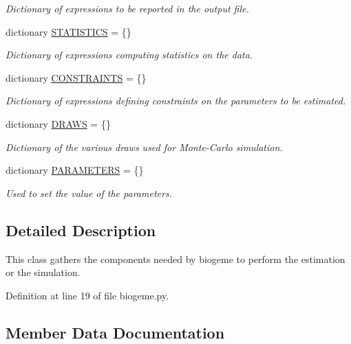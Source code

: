 \begin{DoxyCompactItemize}
\begin{DoxyCompactList}\small\item\em Dictionary of expressions to be reported in the output file. \end{DoxyCompactList}\item 
dictionary \hyperlink{classbiogeme_1_1_b_i_o_g_e_m_e___o_b_j_e_c_t_a93741a718b3b53d9c9430bba5bab00f0}{S\+T\+A\+T\+I\+S\+T\+I\+CS} = \{\}
\begin{DoxyCompactList}\small\item\em Dictionary of expressions computing statistics on the data. \end{DoxyCompactList}\item 
dictionary \hyperlink{classbiogeme_1_1_b_i_o_g_e_m_e___o_b_j_e_c_t_a7eb3a18b4249b2ead855e356c2b40ad4}{C\+O\+N\+S\+T\+R\+A\+I\+N\+TS} = \{\}
\begin{DoxyCompactList}\small\item\em Dictionary of expressions defining constraints on the parameters to be estimated. \end{DoxyCompactList}\item 
dictionary \hyperlink{classbiogeme_1_1_b_i_o_g_e_m_e___o_b_j_e_c_t_a720bc8b02eeff67ec92a4963d508ff7c}{D\+R\+A\+WS} = \{\}
\begin{DoxyCompactList}\small\item\em Dictionary of the various draws used for Monte-\/\+Carlo simulation. \end{DoxyCompactList}\item 
dictionary \hyperlink{classbiogeme_1_1_b_i_o_g_e_m_e___o_b_j_e_c_t_a3f178e0954e495b10c6f08083f1ed7f7}{P\+A\+R\+A\+M\+E\+T\+E\+RS} = \{\}
\begin{DoxyCompactList}\small\item\em Used to set the value of the parameters. \end{DoxyCompactList}\end{DoxyCompactItemize}


\subsection{Detailed Description}
This class gathers the components needed by biogeme to perform the estimation or the simulation. 



Definition at line 19 of file biogeme.\+py.



\subsection{Member Data Documentation}
